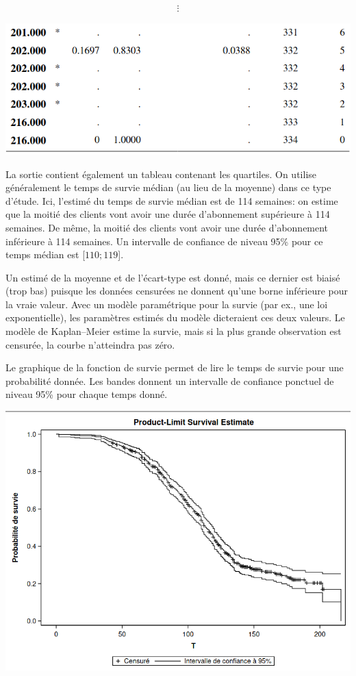 \documentclass[
  11pt,
  letterpaper,
]{book}
\theoremstyle{definition}
\theoremstyle{definition}
\theoremstyle{definition}
\theoremstyle{definition}
\theoremstyle{remark}
\begin{document}
\begin{align*} \vdots \end{align*}

\begin{center}\includegraphics[width=0.7\linewidth]{figures/05-survie-e2} \end{center}

La sortie contient également un tableau contenant les quartiles. On utilise généralement le temps de survie médian (au lieu de la moyenne) dans ce type d'étude. Ici, l'estimé du temps de survie médian est de 114 semaines: on estime que la moitié des clients vont avoir une durée d'abonnement supérieure à 114 semaines. De même, la moitié des clients vont avoir une durée d'abonnement inférieure à 114 semaines. Un intervalle de confiance de niveau 95\% pour ce temps médian est {[}\(110; 119\){]}.

Un estimé de la moyenne et de l'écart-type est donné, mais ce dernier est biaisé (trop bas) puisque les données censurées ne donnent qu'une borne inférieure pour la vraie valeur. Avec un modèle paramétrique pour la survie (par ex., une loi exponentielle), les paramètres estimés du modèle dicteraient ces deux valeurs. Le modèle de Kaplan--Meier estime la survie, mais si la plus grande observation est censurée, la courbe n'atteindra pas zéro.

Le graphique de la fonction de survie permet de lire le temps de survie pour une probabilité donnée. Les bandes donnent un intervalle de confiance ponctuel de niveau 95\% pour chaque temps donné.

\begin{center}\includegraphics[width=0.9\linewidth]{figures/05-survie-e4} \end{center}
\end{document}
